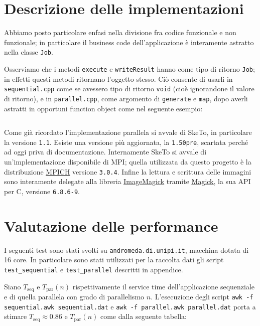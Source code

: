 \documentclass[12pt]{article}
\newcommand{\cpp}{C\nolinebreak\hspace{-.05em}\raisebox{.4ex}{\tiny\bf +}\nolinebreak\hspace{-.10em}\raisebox{.4ex}{\tiny\bf +}}
\newcommand{\mpp}{Magick\nolinebreak\hspace{-.05em}\raisebox{.4ex}{\tiny\bf +}\nolinebreak\hspace{-.10em}\raisebox{.4ex}{\tiny\bf +}}
\begin{document}
    \section{Descrizione delle implementazioni}

    Abbiamo posto particolare enfasi nella divisione fra codice funzionale e
    non funzionale; in particolare il business code dell'applicazione è
    interamente astratto nella classe \texttt{Job}.

    Osserviamo che i metodi \texttt{execute} e \texttt{writeResult} hanno
    come tipo di ritorno \texttt{Job}; in effetti questi metodi ritornano
    l'oggetto stesso. Ciò consente di usarli in \texttt{sequential.cpp} come
    se avessero tipo di ritorno \texttt{void} (cio\`e ignorandone il valore
    di ritorno), e in \texttt{parallel.cpp}, come argomento di
    \texttt{generate} e \texttt{map}, dopo averli astratti in opportuni
    function object come nel seguente esempio:

    \inputminted[]{c++}{tex/src/function-object.cpp}

    Come gi\`a ricordato l'implementazione parallela si avvale di SkeTo, in
    particolare la versione \texttt{1.1}. Esiste una versione pi\`u aggiornata,
    la \texttt{1.50pre}, scartata perch\'e ad oggi priva di documentazione.
    Internamente SkeTo si avvale di un'implementazione disponibile di MPI;
    quella utilizzata da questo progetto \`e la distribuzione
    \href{http://www.mpich.org}{\underline{MPICH}} versione \texttt{3.0.4}. 
    Infine la lettura e scrittura delle immagini sono interamente delegate alla
    libreria \href{http://www.imagemagick.org/script/index.php}{\underline{ImageMagick}}
    tramite \href{http://www.imagemagick.org/script/magick++.php}{\underline{\mpp}},
    la sua API per \cpp, versione \texttt{6.8.6-9}.

    \section{Valutazione delle performance}

    I seguenti test sono stati svolti su \texttt{andromeda.di.unipi.it},
    macchina dotata di 16 core. In particolare sono stati utilizzati per
    la raccolta dati gli script \texttt{test\_sequential} e
    \texttt{test\_parallel} descritti in appendice.

    Siano \(T_{\text{seq}}\) e \(T_{\text{par}}(n)\) rispettivamente il 
    service time dell'applicazione sequenziale e di quella parallela con
    grado di parallelismo \(n\). L'esecuzione degli script
    \texttt{awk -f sequential.awk sequential.dat} e
    \texttt{awk -f parallel.awk parallel.dat} porta a stimare
    \(T_{\text{seq}} \approx 0.86\) e \(T_{\text{par}}(n)\) come
    dalla seguente tabella:
\end{document}
